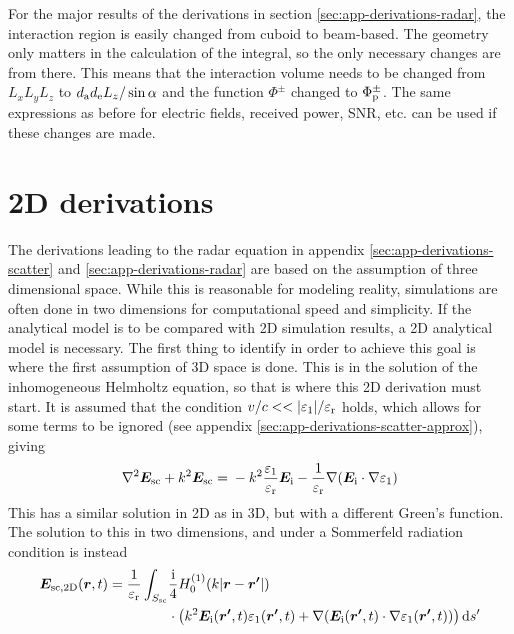 \documentclass[11pt,twoside]{eitExjobb}
\begin{document}
	For the major results of the derivations in section \ref{sec:app-derivations-radar}, the interaction region is easily changed from cuboid to beam-based. The geometry only matters in the calculation of the integral, so the only necessary changes are from there. This means that the interaction volume needs to be changed from $L_{x} L_{y} L_{z}$ to $d_{\mathrm{a}} d_{\mathrm{e}} L_{z}/\sin{\alpha}$ and the function $\Phi^\pm$ changed to $\Phi_{\mathrm{p}}^\pm$. The same expressions as before for electric fields, received power, SNR, etc. can be used if these changes are made.
	
	
	\section{2D derivations} \label{sec:app-derivations-2d}
	The derivations leading to the radar equation in appendix \ref{sec:app-derivations-scatter} and \ref{sec:app-derivations-radar} are based on the assumption of three dimensional space. While this is reasonable for modeling reality, simulations are often done in two dimensions for computational speed and simplicity. If the analytical model is to be compared with 2D simulation results, a 2D analytical model is necessary. The first thing to identify in order to achieve this goal is where the first assumption of 3D space is done. This is in the solution of the inhomogeneous Helmholtz equation, so that is where this 2D derivation must start. It is assumed that the condition $v/c << |\varepsilon_1|/\varepsilon_{\mathrm{r}}$ holds, which allows for some terms to be ignored (see appendix \ref{sec:app-derivations-scatter-approx}), giving
	\begin{equation*}
		\nabla^2\bm{E}_{\mathrm{sc}} + k^2 \bm{E}_{\mathrm{sc}} = \\
		-k^2 \frac{\varepsilon_1}{\varepsilon_{\mathrm{r}}} \bm{E}_{\mathrm{i}} -\frac{1}{\varepsilon_{\mathrm{r}}}\nabla(\bm{E}_{\mathrm{i}} \cdot \nabla \varepsilon_1)
	\end{equation*}
	This has a similar solution in 2D as in 3D, but with a different Green's function. The solution to this in two dimensions, and under a Sommerfeld radiation condition \addref is instead
	\begin{equation*}
	\begin{split}
		\bm{E}_{\mathrm{sc,2D}}(\bm{r},t) = \frac{1}{\varepsilon_{\mathrm{r}}} \int_{S_{\mathrm{sc}}} & \frac{\mathrm{i}}{4} H_0^{(1)}( k |\bm{r}-\bm{r'}|) \\
		&\cdot \left( k^2 \bm{E}_{\mathrm{i}} (\bm{r'},t) \varepsilon_1 (\bm{r'},t) + \nabla (\bm{E}_{\mathrm{i}} (\bm{r'},t) \cdot \nabla \varepsilon_1 (\bm{r'},t)) \right) \mathrm{d}s'
	\end{split}
	\end{equation*}
\end{document}
